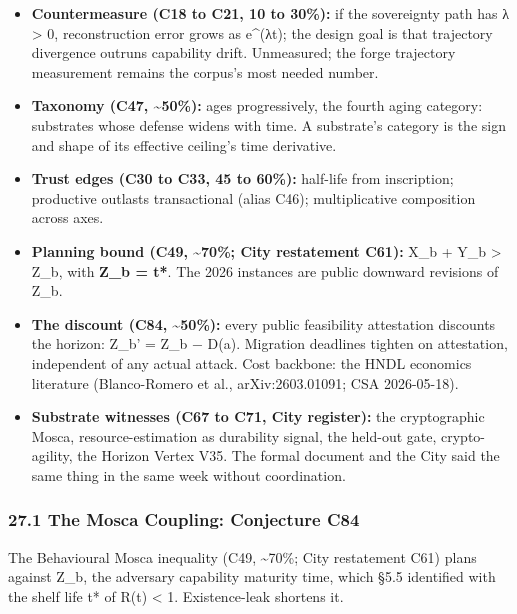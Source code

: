 \documentclass[
]{article}
\providecommand{\tightlist}{%
  \setlength{\itemsep}{0pt}\setlength{\parskip}{0pt}}
\begin{document}
\begin{itemize}
\tightlist
\item
  \textbf{Countermeasure (C18 to C21, 10 to 30\%):} if the sovereignty
  path has λ \textgreater{} 0, reconstruction error grows as e\^{}(λt);
  the design goal is that trajectory divergence outruns capability
  drift. Unmeasured; the forge trajectory measurement remains the
  corpus's most needed number.
\item
  \textbf{Taxonomy (C47, \textasciitilde50\%):} ages progressively, the
  fourth aging category: substrates whose defense widens with time. A
  substrate's category is the sign and shape of its effective ceiling's
  time derivative.
\item
  \textbf{Trust edges (C30 to C33, 45 to 60\%):} half-life from
  inscription; productive outlasts transactional (alias C46);
  multiplicative composition across axes.
\item
  \textbf{Planning bound (C49, \textasciitilde70\%; City restatement
  C61):} X\_b + Y\_b \textgreater{} Z\_b, with \textbf{Z\_b = t*}. The
  2026 instances are public downward revisions of Z\_b.
\item
  \textbf{The discount (C84, \textasciitilde50\%):} every public
  feasibility attestation discounts the horizon: Z\_b' = Z\_b − D(a).
  Migration deadlines tighten on attestation, independent of any actual
  attack. Cost backbone: the HNDL economics literature (Blanco-Romero et
  al., arXiv:2603.01091; CSA 2026-05-18).
\item
  \textbf{Substrate witnesses (C67 to C71, City register):} the
  cryptographic Mosca, resource-estimation as durability signal, the
  held-out gate, crypto-agility, the Horizon Vertex V35. The formal
  document and the City said the same thing in the same week without
  coordination.
\end{itemize}

\subsubsection{27.1 The Mosca Coupling: Conjecture
C84}\label{the-mosca-coupling-conjecture-c84}

The Behavioural Mosca inequality (C49, \textasciitilde70\%; City
restatement C61) plans against Z\_b, the adversary capability maturity
time, which §5.5 identified with the shelf life t* of R(t) \textless{}
1. Existence-leak shortens it.
\end{document}
